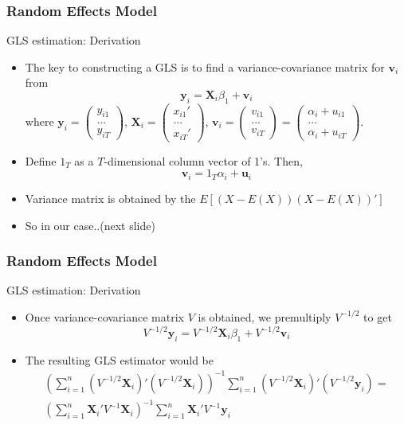 \documentclass{beamer}
\begin{document}
\begin{frame}
\frametitle{Random Effects Model}
GLS estimation: Derivation
\begin{itemize}
\item The key to constructing a GLS is to find a variance-covariance matrix for $\mathbf{v}_i$ from
\[
\mathbf{y}_ i = \mathbf{X}_i\beta_1 + \mathbf{v}_i
\]
where $\mathbf{y}_i = \begin{pmatrix}y_{i1} \\ ... \\ y_{iT} \end{pmatrix}$, $\mathbf{X}_i=\begin{pmatrix}x_{i1}' \\ ... \\ x_{iT}' \end{pmatrix}$,  $\mathbf{v}_i = \begin{pmatrix}v_{i1} \\ ... \\ v_{iT} \end{pmatrix}=\begin{pmatrix}\alpha_i+u_{i1} \\ ... \\ \alpha_i+u_{iT} \end{pmatrix}$. 
\item Define $1_T$ as a $T$-dimensional column vector of 1's.  Then,
\[
\mathbf{v}_i = 1_T\alpha_i + \mathbf{u}_i
\]
\item Variance matrix is obtained by the $E[(X-E(X))(X-E(X))']$
\item So in our case..(next slide)
\end{itemize}
\end{frame}

\begin{frame}
\frametitle{Random Effects Model}
GLS estimation: Derivation
\begin{itemize}
\item Once variance-covariance matrix $V$ is obtained, we premultiply $V^{-1/2}$ to get
\[
V^{-1/2}\mathbf{y}_ i = V^{-1/2}\mathbf{X}_i\beta_1 + V^{-1/2}\mathbf{v}_i
\]
 \item The resulting GLS estimator would be
\begin{gather*}
\left(\sum_{i=1}^n (V^{-1/2}\mathbf{X}_i)'(V^{-1/2}\mathbf{X}_i)\right)^{-1}\sum_{i=1}^n (V^{-1/2}\mathbf{X}_i)'(V^{-1/2}\mathbf{y}_i)=\\
\left(\sum_{i=1}^n \mathbf{X}_i'V^{-1}\mathbf{X}_i\right)^{-1}\sum_{i=1}^n \mathbf{X}_i'V^{-1}\mathbf{y}_i
\end{gather*}
\end{itemize}
\end{frame}
\end{document}
